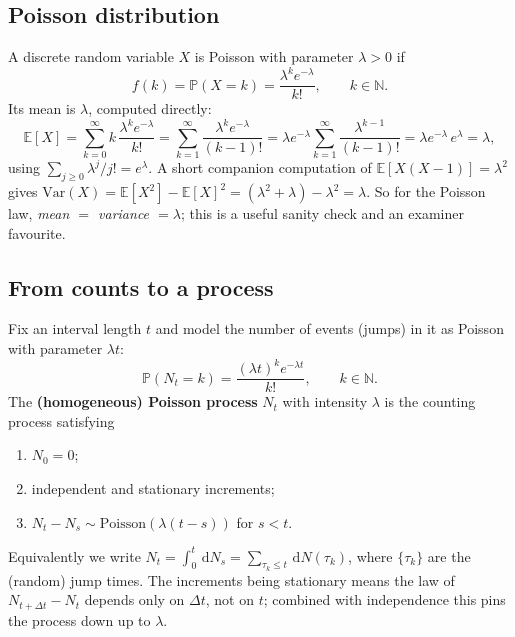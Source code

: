 \documentclass[11pt]{article}
\newcommand{\E}{\mathbb{E}}
\newcommand{\dd}{\,\mathrm{d}}
\begin{document}
\subsection{Poisson distribution}
A discrete random variable $X$ is Poisson with parameter $\lambda>0$ if
\begin{equation}\label{eq:poispmf}
f(k)=\mathbb{P}(X=k)=\frac{\lambda^{k}e^{-\lambda}}{k!},\qquad k\in\mathbb{N}.
\end{equation}
Its mean is $\lambda$, computed directly:
\[
\E[X]=\sum_{k=0}^{\infty} k\,\frac{\lambda^{k}e^{-\lambda}}{k!}
=\sum_{k=1}^{\infty}\frac{\lambda^{k}e^{-\lambda}}{(k-1)!}
=\lambda e^{-\lambda}\sum_{k=1}^{\infty}\frac{\lambda^{k-1}}{(k-1)!}
=\lambda e^{-\lambda}\,e^{\lambda}=\lambda,
\]
using $\sum_{j\ge0}\lambda^{j}/j!=e^{\lambda}$. A short companion computation of $\E[X(X-1)]=\lambda^2$
gives $\mathrm{Var}(X)=\E[X^2]-\E[X]^2=(\lambda^2+\lambda)-\lambda^2=\lambda$. So for the Poisson law,
\emph{mean $=$ variance $=\lambda$}; this is a useful sanity check and an examiner favourite.

\subsection{From counts to a process}
Fix an interval length $t$ and model the number of events (jumps) in it as Poisson with parameter
$\lambda t$:
\[
\mathbb{P}(N_t=k)=\frac{(\lambda t)^{k}e^{-\lambda t}}{k!},\qquad k\in\mathbb{N}.
\]
The \textbf{(homogeneous) Poisson process} $N_t$ with intensity $\lambda$ is the counting process
satisfying
\begin{enumerate}[label=(\roman*),topsep=2pt,itemsep=1pt]
  \item $N_0=0$;
  \item independent and stationary increments;
  \item $N_{t}-N_{s}\sim \mathrm{Poisson}(\lambda(t-s))$ for $s<t$.
\end{enumerate}
Equivalently we write $N_t=\int_0^t \dd N_s = \sum_{\tau_k\le t}\dd N(\tau_k)$, where $\{\tau_k\}$ are
the (random) jump times. The increments being stationary means the law of $N_{t+\Delta t}-N_t$ depends
only on $\Delta t$, not on $t$; combined with independence this pins the process down up to $\lambda$.
\end{document}
